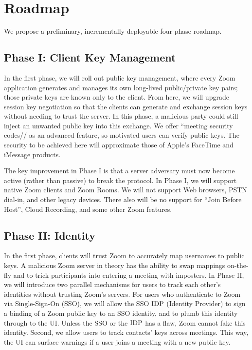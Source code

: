 \section{Roadmap}
We propose a preliminary, incrementally-deployable four-phase roadmap.

\subsection{Phase I: Client Key Management}
In the first phase, we will roll out public key management, where every Zoom application generates and manages its own long-lived public/private key pairs; those private keys are known only to the client. From here, we will upgrade session key negotiation so that the clients can generate and exchange session keys without needing to trust the server. In this phase, a malicious party could still inject an unwanted public key into this exchange. We offer ``meeting security codes// as an advanced feature, so motivated users can verify public keys. The security to be achieved here will approximate those of Apple's FaceTime and iMessage products.

The key improvement in Phase I is that a server adversary must now become active (rather than passive) to break the protocol. In Phase I, we will support native Zoom clients and Zoom Rooms. We will not support Web browsers, PSTN dial-in, and other legacy devices. There also will be no support for ``Join Before Host'', Cloud Recording, and some other Zoom features.

\subsection{Phase II: Identity}
In the first phase, clients will trust Zoom to accurately map usernames to public keys. A malicious Zoom server in theory has the ability to swap mappings on-the-fly and to trick participants into entering a meeting with imposters. In Phase II, we will introduce two parallel mechanisms for users to track each other's identities without trusting Zoom's servers.  For users who authenticate to Zoom via Single-Sign-On (SSO), we will allow the SSO $\mathrm{IDP}$ (Identity Provider) to sign a binding of a Zoom public key to an SSO identity, and to plumb this identity through to the UI. Unless the SSO or the $\mathrm{IDP}$ has a flaw, Zoom cannot fake this identity. Second, we allow users to track contacts' keys across meetings. This way, the UI can surface warnings if a user joins a meeting with a new public key. 

